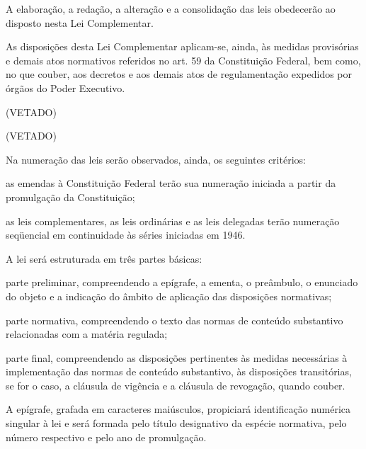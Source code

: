 \documentclass[calibri]{brlex2}
\begin{document}
\metadata

\art A elaboração, a redação, a alteração e a consolidação das leis obedecerão ao disposto nesta Lei Complementar.

\parun As disposições desta Lei Complementar aplicam-se, ainda, às medidas provisórias e demais atos normativos referidos no art. 59 da Constituição Federal, bem como, no que couber, aos decretos e aos demais atos de regulamentação expedidos por órgãos do Poder Executivo.

\art (VETADO)

\so (VETADO)

\so Na numeração das leis serão observados, ainda, os seguintes critérios:

\inc as emendas à Constituição Federal terão sua numeração iniciada a partir da promulgação da Constituição;

\inc as leis complementares, as leis ordinárias e as leis delegadas terão numeração seqüencial em continuidade às séries iniciadas em 1946.



\art A lei será estruturada em três partes básicas:

\inc parte preliminar, compreendendo a epígrafe, a ementa, o preâmbulo, o enunciado do objeto e a indicação do âmbito de aplicação das disposições normativas;

\inc parte normativa, compreendendo o texto das normas de conteúdo substantivo relacionadas com a matéria regulada;

\inc parte final, compreendendo as disposições pertinentes às medidas necessárias à implementação das normas de conteúdo substantivo, às disposições transitórias, se for o caso, a cláusula de vigência e a cláusula de revogação, quando couber.

\art A epígrafe, grafada em caracteres maiúsculos, propiciará identificação numérica singular à lei e será formada pelo título designativo da espécie normativa, pelo número respectivo e pelo ano de promulgação.
\end{document}
